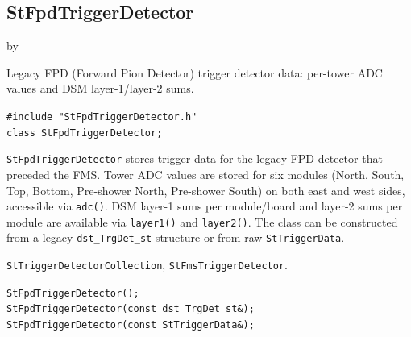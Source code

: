 \documentclass[twoside]{article}
\newcommand{\entrylabel}[1]{\mbox{\textbf{{#1}}}\hfil}%
\newenvironment{entry}
{\begin{list}{}%
    {\renewcommand{\makelabel}{\entrylabel}%
     \setlength{\labelwidth}{90pt}%
     \setlength{\leftmargin}{\labelwidth}
     \advance\leftmargin by \labelsep%
      }%
    }%
  {\end{list}}
\newcommand{\Entrylabel}[1]%
{\raisebox{0pt}[1ex][0pt]{\makebox[\labelwidth][l]%
    {\parbox[t]{\labelwidth}{\hspace{0pt}\textbf{{#1}}}}}}
\newenvironment{Entry}%
{\renewcommand{\entrylabel}{\Entrylabel}\begin{entry}}%
  {\end{entry}}
\begin{document}
\clearpage

\subsection{StFpdTriggerDetector}
\label{sec:StFpdTriggerDetector}
\begin{Entry}
\item[Summary]
    Legacy FPD (Forward Pion Detector) trigger detector data: per-tower ADC
    values and DSM layer-1/layer-2 sums.

\item[Synopsis]
    \verb+#include "StFpdTriggerDetector.h"+\\
    \verb+class StFpdTriggerDetector;+\\

\item[Description]
    \texttt{StFpdTriggerDetector} stores trigger data for the legacy FPD
    detector that preceded the FMS.  Tower ADC values are stored for six
    modules (North, South, Top, Bottom, Pre-shower North, Pre-shower South)
    on both east and west sides, accessible via \texttt{adc()}.  DSM
    layer-1 sums per module/board and layer-2 sums per module are available
    via \texttt{layer1()} and \texttt{layer2()}.  The class can be constructed
    from a legacy \texttt{dst\_TrgDet\_st} structure or from raw
    \texttt{StTriggerData}.

\item[Related Classes]
    \texttt{StTriggerDetectorCollection}, \texttt{StFmsTriggerDetector}.

\item[Public\\ Constructors]
    \verb+StFpdTriggerDetector();+\\
    \verb+StFpdTriggerDetector(const dst_TrgDet_st&);+\\
    \verb+StFpdTriggerDetector(const StTriggerData&);+\\


\end{Entry}
\end{document}
